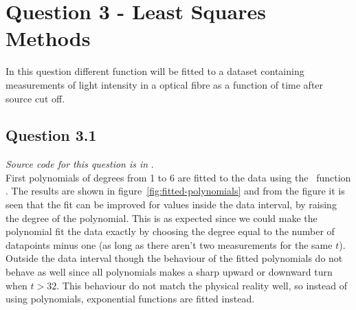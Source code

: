 \section*{Question 3 - Least Squares Methods}
In this question different function will be fitted to a dataset containing measurements of light intensity in a optical fibre as a function of time after source cut off.

\subsection*{Question 3.1}
\textit{Source code for this question is in }. \\
First polynomials of degrees from 1 to 6 are fitted to the data using the \matlab\ function . The results are shown in figure~\ref{fig:fitted-polynomials} and from the figure it is seen that the fit can be improved for values inside the data interval, by raising the degree of the polynomial. This is as expected since we could make the polynomial fit the data exactly by choosing the degree equal to the number of datapoints minus one (as long as there aren't two measurements for the same $t$). Outside the data interval though the behaviour of the fitted polynomials do not behave as well since all polynomials makes a sharp upward or downward turn when $t>32$. This behaviour do not match the physical reality well, so instead of using polynomials, exponential functions are fitted instead.

